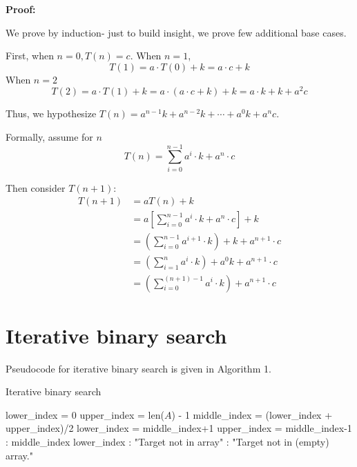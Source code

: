 \documentclass[paper=a4, fontsize=11pt]{scrartcl} %
\numberwithin{equation}{section} %
\numberwithin{figure}{section} %
\numberwithin{table}{section} %
\begin{document}
\textbf{Proof:}

We prove by induction- just to build insight, we prove few additional base cases.

First, when $n = 0, T(n) = c$.
When $n = 1$,
\[T(1) = a \cdot T(0) + k = a \cdot c + k\]
When $n = 2$
\[T(2) = a\cdot T(1) + k = a\cdot(a \cdot c + k) + k = a\cdot k + k + a^2 c\]

Thus, we hypothesize $T(n) = a^{n-1}k + a^{n-2}k + \cdots + a^{0}k + a^n c$.

Formally, assume for $n$
\[T(n) = \sum_{i = 0}^{n-1} a^i \cdot k + a^n \cdot c\]

Then consider $T(n+1)$:
\begin{align*}
T(n+1) &= a T(n) + k \\
	   &= a \left[\sum_{i = 0}^{n-1} a^i \cdot k + a^n \cdot c\right] + k \\
	   &= \left(\sum_{i = 0}^{n-1} a^{i+1} \cdot k\right) + k + a^{n+1} \cdot c \\
	   &= \left(\sum_{i = 1}^{n} a^i \cdot k\right) + a^0 k + a^{n+1} \cdot c \\
	   &= \left(\sum_{i = 0}^{(n+1)-1} a^i \cdot k\right) + a^{n+1} \cdot c
\end{align*}



\section{Iterative binary search}

Pseudocode for iterative binary search is given in Algorithm 1.

\begin{algorithm}\small
\caption{Iterative binary search}
\label{itbs}
\begin{algorithmic}[1]
	\State lower\_index = $0$
	\State upper\_index = len($A$) - 1
		\State middle\_index = (lower\_index + upper\_index)/2
			\State lower\_index = middle\_index+1
			\State upper\_index = middle\_index-1
		\Else:
			\State \Return middle\_index
		\EndIf
	\EndWhile
			\State \Return lower\_index
		\Else: 
			\State \Return "Target not in array"
		\EndIf
	\Else:
		\State \Return "Target not in (empty) array."
	\EndIf
\EndFunction
\end{algorithmic}
\end{algorithm}
\end{document}
